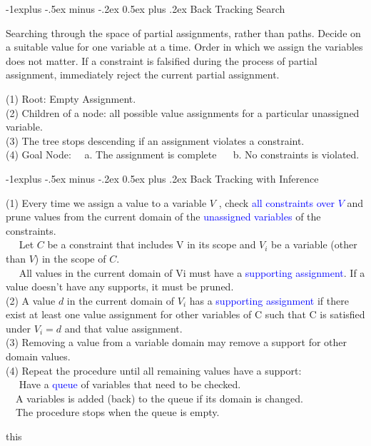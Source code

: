 \documentclass[10pt,landscape]{article}
\makeatletter
\renewcommand{\subsection}{\@startsection{subsection}{2}{0mm}%
                                {-1explus -.5ex minus -.2ex}%
                                {0.5ex plus .2ex}%
                                {\normalfont\normalsize\bfseries}}
\makeatother
\begin{document}
\begin{multicols}{2}
\subsection{Back Tracking Search}

Searching through the space of partial assignments, rather than paths. Decide on a suitable value for one variable at a time. Order in which we assign the variables does not matter. If a constraint is falsified during the process of partial assignment, immediately reject the current partial assignment.

(1) Root: Empty Assignment.  \\
(2) Children of a node: all possible value assignments for a particular unassigned variable. \\
(3) The tree stops descending if an assignment violates a constraint.  \\
(4) Goal Node:
$\quad$a. The assignment is complete $\quad$ b. No constraints is violated.

\subsection{Back Tracking with Inference}

(1) Every time we assign a value to a variable $V$ , check \textcolor{blue}{all constraints over $V$} and prune values from the current domain of the \textcolor{blue}{unassigned variables} of the constraints. \\
$\quad$ Let $C$ be a constraint that includes V in its scope and $V_i$ be a variable (other than $V$) in the scope of $C$. \\
$\quad$ All values in the current domain of Vi must have a \textcolor{blue}{supporting assignment}. If a value doesn’t have any supports, it must be pruned.  \\
(2) A value $d$ in the current domain of $V_i$ has a \textcolor{blue}{supporting assignment} if there exist at least one value assignment for other variables of C such that C is satisfied under $V_i = d$ and that value assignment. \\
(3) Removing a value from a variable domain may remove a support for other domain values. \\
(4) Repeat the procedure until all remaining values have a support:\\
$\quad$ Have a \textcolor{blue}{queue} of variables that need to be checked.\\
$\quad$A variables is added (back) to the queue if its domain is changed.\\
$\quad$The procedure stops when the queue is empty.\\
\newpage

this

\end{multicols}
\end{document}
